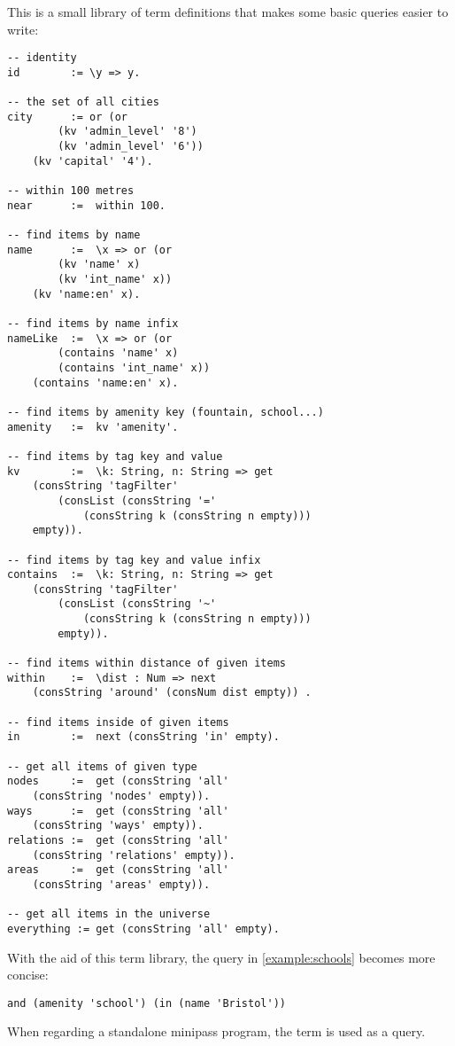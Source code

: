\documentclass[main.tex]{subfiles}
\begin{document}
This is a small library of term definitions that makes some basic queries
easier to write:
\begin{lstlisting}
-- identity
id        := \y => y.

-- the set of all cities
city      := or (or
        (kv 'admin_level' '8')
        (kv 'admin_level' '6'))
    (kv 'capital' '4').

-- within 100 metres
near      :=  within 100.

-- find items by name
name      :=  \x => or (or
        (kv 'name' x)
        (kv 'int_name' x))
    (kv 'name:en' x).

-- find items by name infix
nameLike  :=  \x => or (or
        (contains 'name' x)
        (contains 'int_name' x))
    (contains 'name:en' x).

-- find items by amenity key (fountain, school...)
amenity   :=  kv 'amenity'.

-- find items by tag key and value
kv        :=  \k: String, n: String => get
    (consString 'tagFilter'
        (consList (consString '='
            (consString k (consString n empty)))
    empty)).

-- find items by tag key and value infix
contains  :=  \k: String, n: String => get
    (consString 'tagFilter'
        (consList (consString '~'
            (consString k (consString n empty)))
        empty)).

-- find items within distance of given items
within    :=  \dist : Num => next
    (consString 'around' (consNum dist empty)) .

-- find items inside of given items
in        :=  next (consString 'in' empty).

-- get all items of given type
nodes     :=  get (consString 'all'
    (consString 'nodes' empty)).
ways      :=  get (consString 'all'
    (consString 'ways' empty)).
relations :=  get (consString 'all'
    (consString 'relations' empty)).
areas     :=  get (consString 'all'
    (consString 'areas' empty)).

-- get all items in the universe
everything := get (consString 'all' empty).
\end{lstlisting}

\begin{example}
    With the aid of this term library, the query in \cref{example:schools}
    becomes more concise:

    \begin{lstlisting}
and (amenity 'school') (in (name 'Bristol'))
    \end{lstlisting}
\end{example}

When regarding a standalone minipass program, the term  is used
as a query.
\end{document}
